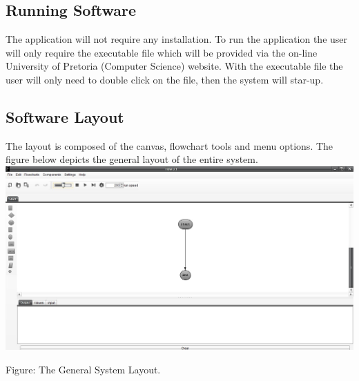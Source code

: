 \documentclass[11pt,a4paper,titlepage]{article}
\begin{document}








	
	\subsection{Running Software}
		The application will not require any installation. To run the application the user will only require the executable file which will be provided via the on-line University of Pretoria (Computer Science) website. With the executable file the user will only need to double click on the file, then the system will star-up.
		
		\subsection{Software Layout}
		The layout is composed of the canvas, flowchart tools and menu options. \newline 
		The figure below depicts the general layout of the entire system. \newline \newline
		\includegraphics[width=\textwidth]{SystemLayout.jpg}
		\begin{center}
		Figure: The General System Layout.\newline
		\end{center}
		
\end{document}
